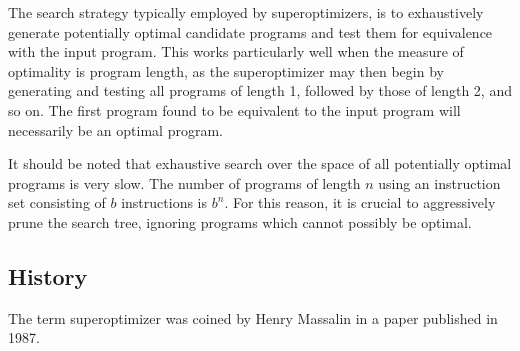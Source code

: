 \documentclass[a4paper,11pt]{kth-mag}
\begin{document}
The search strategy typically employed by superoptimizers, is to exhaustively generate potentially optimal candidate programs and test them for equivalence with the input program.
This works particularly well when the measure of optimality is program length, as the superoptimizer may then begin by generating and testing all programs of length 1, followed by those of length 2, and so on.
The first program found to be equivalent to the input program will necessarily be an optimal program.

It should be noted that exhaustive search over the space of all potentially optimal programs is very slow.
The number of programs of length $n$ using an instruction set consisting of $b$ instructions is $b^n$. %
For this reason, it is crucial to aggressively prune the search tree, ignoring programs which cannot possibly be optimal.


\subsection{History}

The term superoptimizer was coined by Henry Massalin in a paper published in 1987.
\cite{massalin87}

\cite{granlund92}

\cite{joshi02}

\cite{joshi06}

\cite{bansal_thesis}
\end{document}
